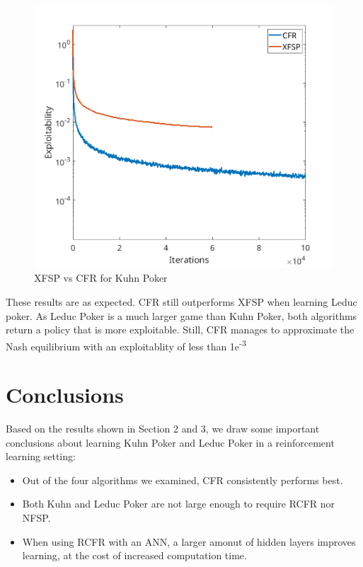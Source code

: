 \documentclass[10pt,a4paper]{article}
\begin{document}
\begin{figure}[h]
\centering
\includegraphics[scale=0.4]{Figures/cfr_vs_xfsp_leduc.png}
\caption{XFSP vs CFR for Kuhn Poker}
\label{fig:xfsp_vs_cfr_leduc}
\end{figure}

These results are as expected. CFR still outperforms XFSP when learning Leduc poker. As Leduc Poker is a much larger game than Kuhn Poker, both algorithms return a policy that is more exploitable. Still, CFR manages to approximate the Nash equilibrium with an exploitablity of less than 1e\textsuperscript{-3}

\section{Conclusions}

Based on the results shown in Section 2 and 3, we draw some important conclusions about learning Kuhn Poker and Leduc Poker in a reinforcement learning setting:

\begin{itemize}
\item{Out of the four algorithms we examined, CFR consistently performs best. }
\item{Both Kuhn and Leduc Poker are not large enough to require RCFR nor NFSP.}
\item{When using RCFR with an ANN, a larger amonut of hidden layers improves learning, at the cost of increased computation time.}
\end{itemize}
\end{document}
